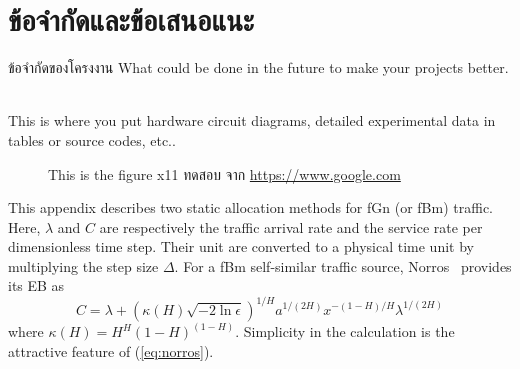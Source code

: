 \documentclass[12pt,oneside,openright,a4paper]{cpe-thai-project}
\begin{document}
\section{ข้อจำกัดและข้อเสนอแนะ}
ข้อจำกัดของโครงงาน What could be done in the future to make your projects better.



\makeatletter
\g@addto@macro{\UrlBreaks}{\UrlOrds}
\makeatother
% 




 \\

This is where you put hardware circuit diagrams, detailed experimental data in tables or source codes, etc.. \\ \bigskip


\begin{figure}[!h]
  \caption{This is the figure x11 ทดสอบ จาก \href{https://www.google.com} {https://www.google.com}}\label{fig:x1}
\end{figure}


This appendix describes two static allocation methods for fGn (or fBm)
traffic. Here, $\lambda$ and $C$ are respectively the traffic arrival
rate and the service rate per dimensionless time step. Their unit are
converted to a physical time unit by multiplying the step size
$\Delta$. For a fBm self-similar traffic source,
Norros~\cite{norros95} provides its EB as
\begin{equation}\label{eq:norros}
  C = \lambda + (\kappa(H)\sqrt{-2\ln\epsilon})^{1/H}a^{1/(2H)}x^{-(1-H)/H}\lambda^{1/(2H)}
\end{equation}
where $\kappa(H) = H^H(1-H)^{(1-H)}$. Simplicity in the calculation is
the attractive feature of (\ref{eq:norros}).
\end{document}
